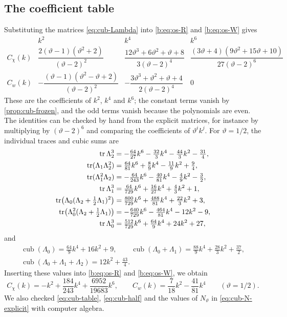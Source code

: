 \subsection{The coefficient table}

Substituting the matrices \eqref{eq:cub-Lambda} into \eqref{b:eq:os-R} and
\eqref{b:eq:os-W} gives
\begin{equation}\label{eq:cub-table}
\begin{array}{c|ccc}
 &k^2&k^4&k^6\\ \hline
 C_\chi(k)&\dfrac{2(\vartheta-1)(\vartheta^2+2)}{(\vartheta-2)^2}
 &\dfrac{12\vartheta^3+6\vartheta^2+\vartheta+8}{3(\vartheta-2)^4}
 &\dfrac{(3\vartheta+4)(9\vartheta^2+15\vartheta+10)}{27(\vartheta-2)^6}\\[8pt]
 C_w(k)&-\dfrac{(\vartheta-1)(\vartheta^2-\vartheta+2)}{(\vartheta-2)^2}
 &-\dfrac{3\vartheta^3+\vartheta^2+\vartheta+4}{2(\vartheta-2)^4}&0
\end{array}
\end{equation}
These are the coefficients of $k^2$, $k^4$ and $k^6$; the constant terms vanish
by \cref{prop:cub-frozen}, and the odd terms vanish because the polynomials are
even. The identities can be checked by hand from the explicit matrices, for
instance by multiplying by $(\vartheta-2)^6$ and comparing the coefficients
of $\vartheta^i k^j$. For $\vartheta=1/2$, the individual traces and cubic sums are
\[
\begin{aligned}
 \operatorname{tr}\Lambda_2^3&=-\tfrac{64}{27}k^6-\tfrac{32}3k^4-\tfrac{44}3k^2-\tfrac{31}4,\\
 \operatorname{tr}(\Lambda_1\Lambda_2^2)&=\tfrac{64}{81}k^6+\tfrac89k^4-\tfrac{11}9k^2+\tfrac94,\\
 \operatorname{tr}(\Lambda_1^2\Lambda_2)&=-\tfrac{64}{243}k^6-\tfrac{40}{81}k^4-\tfrac49k^2-\tfrac32,\\
 \operatorname{tr}\Lambda_1^3&=\tfrac{64}{729}k^6+\tfrac{16}{27}k^4+\tfrac43k^2+1,\\
 \operatorname{tr}\bigl(\Lambda_0(\Lambda_2+\tfrac12\Lambda_1)^2\bigr)
 &=\tfrac{800}{729}k^6+\tfrac{488}{81}k^4+\tfrac{22}3k^2+3,\\
 \operatorname{tr}\bigl(\Lambda_0^2(\Lambda_2+\tfrac12\Lambda_1)\bigr)
 &=-\tfrac{640}{729}k^6-\tfrac{464}{81}k^4-12k^2-9,\\
 \operatorname{tr}\Lambda_0^3&=\tfrac{512}{729}k^6+\tfrac{64}9k^4+24k^2+27,
\end{aligned}
\]
and
\[
\begin{gathered}
 \operatorname{cub}(\Lambda_0)=\tfrac{64}9k^4+16k^2+9,\qquad
 \operatorname{cub}(\Lambda_0+\Lambda_1)=\tfrac{88}9k^4+\tfrac{28}3k^2+\tfrac{37}2,\\
 \operatorname{cub}(\Lambda_0+\Lambda_1+\Lambda_2)=12k^2+\tfrac{43}4.
\end{gathered}
\]
Inserting these values into \eqref{b:eq:os-R} and \eqref{b:eq:os-W}, we obtain
\begin{equation}\label{eq:cub-half}
 C_\chi(k)=-k^2+\frac{184}{243}k^4+\frac{6952}{19683}k^6,\qquad
 C_w(k)=\frac7{18}k^2-\frac{41}{81}k^4\qquad(\vartheta=1/2).
\end{equation}
We also checked \eqref{eq:cub-table}, \eqref{eq:cub-half} and the values of
$N_\vartheta$ in \eqref{eq:cub-N-explicit} with computer algebra.

